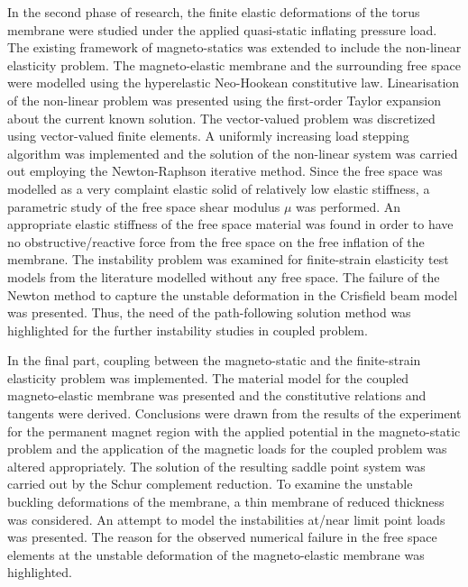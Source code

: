 In the second phase of research, the finite elastic deformations of the torus membrane were studied under the applied quasi-static inflating pressure load. The existing framework of magneto-statics was extended to include the non-linear elasticity problem. The magneto-elastic membrane and the surrounding free space were modelled using the hyperelastic Neo-Hookean constitutive law. Linearisation of the non-linear problem was presented using the first-order Taylor expansion about the current known solution. The vector-valued problem was discretized using vector-valued finite elements. A uniformly increasing load stepping algorithm was implemented and the solution of the non-linear system was carried out employing the Newton-Raphson iterative method. Since the free space was modelled as a very complaint elastic solid of relatively low elastic stiffness, a parametric study of the free space shear modulus $\mu$ was performed. An appropriate elastic stiffness of the free space material was found in order to have no obstructive/reactive force from the free space on the free inflation of the membrane. The instability problem was examined for finite-strain elasticity test models from the literature modelled without any free space. The failure of the Newton method to capture the unstable deformation in the Crisfield beam model was presented. Thus, the need of the path-following solution method was highlighted for the further instability studies in coupled problem. \par 
In the final part, coupling between the magneto-static and the finite-strain elasticity problem was implemented. The material model for the coupled magneto-elastic membrane was presented and the constitutive relations and tangents were derived. Conclusions were drawn from the results of the experiment for the permanent magnet region with the applied potential in the magneto-static problem and the application of the magnetic loads for the coupled problem was altered appropriately. The solution of the resulting saddle point system was carried out by the Schur complement reduction. To examine the unstable buckling deformations of the membrane, a thin membrane of reduced thickness was considered. An attempt to model the instabilities at/near limit point loads was presented. The reason for the observed numerical failure in the free space elements at the unstable deformation of the magneto-elastic membrane was highlighted.

